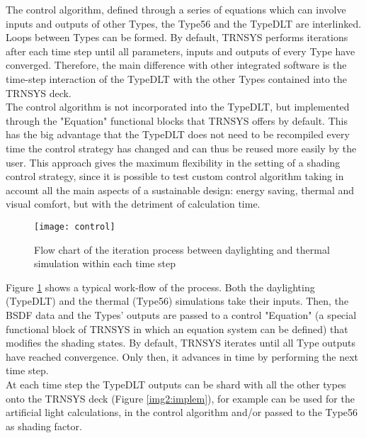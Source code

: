 The control algorithm, defined through a series of equations which can involve inputs and outputs of other Types, the Type56 and the TypeDLT are interlinked. Loops between Types can be formed. By default, TRNSYS performs iterations after each time step until all parameters, inputs and outputs of every Type have converged. Therefore, the main difference with other integrated software is the time-step interaction of the TypeDLT with the other Types contained into the TRNSYS deck. \\
The control algorithm is not incorporated into the TypeDLT, but implemented through the "Equation" functional blocks that TRNSYS offers by default. This has the big advantage that the TypeDLT does not need to be recompiled every time the control strategy has changed and can thus be reused more easily by the user.
This approach gives the maximum flexibility in the setting of a shading control strategy, since it is possible to test custom control algorithm taking in account all the main aspects of a sustainable design: energy saving, thermal and visual comfort, but with the detriment of calculation time.

\begin{figure}[h]
\centering
\texttt{[image: control]}
\caption{\label{img2:flow} Flow chart of the iteration process between daylighting and thermal simulation within each time step}
\end{figure}

Figure \ref{img2:flow} shows a typical work-flow of the process. Both the daylighting (TypeDLT) and the thermal (Type56) simulations take their inputs. Then, the BSDF data and the Types' outputs are passed to a control "Equation" (a special functional block of TRNSYS in which an equation system can be defined) that modifies the shading states. By default, TRNSYS iterates until all Type outputs have reached convergence. Only then, it advances in time by performing the next time step.\\ 
At each time step the TypeDLT outputs can be shard with all the other types onto the TRNSYS deck (Figure \ref{img2:implem}), for example can be used for the artificial light calculations, in the control algorithm and/or passed to the Type56 as shading factor.


